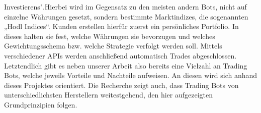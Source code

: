 \documentclass[sigconf]{acmart}
\begin{document}
Investierens".\newline Hierbei wird im Gegensatz zu den meisten andern Bots, nicht auf einzelne Währungen
gesetzt, sondern bestimmte Marktindizes, die sogenannten „Hodl Indices“. Kunden erstellen hierfür
zuerst ein persönliches Portfolio. In dieses halten sie fest, welche Währungen sie bevorzugen und
welches Gewichtungsschema bzw. welche Strategie verfolgt werden soll. Mittels verschiedener APIs
werden anschließend automatisch Trades abgeschlossen.\newline
Letztendlich gibt es neben unserer Arbeit also bereits eine Vielzahl an Trading Bots, welche jeweils
Vorteile und Nachteile aufweisen. An diesen wird sich anhand dieses Projektes orientiert. Die
Recherche zeigt auch, dass Trading Bots von unterschiedlichsten Herstellern weitestgehend, den hier
aufgezeigten Grundprinzipien folgen.











\listoffigures
\end{document}
